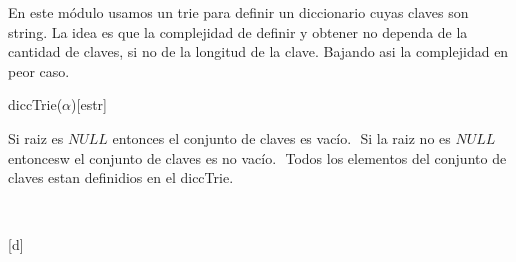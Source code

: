 \begin{Representacion}
  
  
	En este m\'odulo usamos un trie para definir un diccionario cuyas claves son string.
$ $\newline La idea es que la complejidad de definir y obtener no dependa de la cantidad de claves, si no de la longitud de la clave. Bajando asi la complejidad en peor caso.  
  
  \begin{Estructura}{diccTrie($\alpha$)}[estr]
    \begin{Tupla}[estr]
    \end{Tupla}

    \begin{Tupla}[nodo]
    \end{Tupla}
  \end{Estructura}

\pagebreak

Si raiz es $NULL$ entonces el conjunto de claves es vac\'io. $ $\newline
Si la raiz no es $NULL$ entoncesw el conjunto de claves es no vac\'io. $ $\newline
Todos los elementos del conjunto de claves estan definidios en el diccTrie.
$ $\newline
 
  ~
 
  \AbsFc[]{}[d]{}


\end{Representacion}

